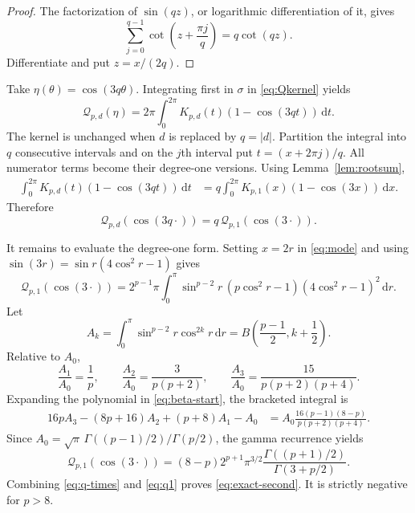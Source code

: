 \documentclass[11pt]{article}
\newcommand{\dd}{\,\mathrm d}
\begin{document}
\begin{proof}
The factorization of $\sin(qz)$, or logarithmic differentiation of it, gives
\[
 \sum_{j=0}^{q-1}\cot\!\left(z+\frac{\pi j}{q}\right)
 =q\cot(qz).
\]
Differentiate and put $z=x/(2q)$.
\end{proof}

Take $\eta(\theta)=\cos(3q\theta)$.  Integrating first in $\sigma$ in
\eqref{eq:Qkernel} yields
\begin{equation}\label{eq:mode}
 \mathcal Q_{p,d}(\eta)
 =2\pi\int_0^{2\pi}K_{p,d}(t)
 (1-\cos(3qt))\dd t.
\end{equation}
The kernel is unchanged when $d$ is replaced by $q=|d|$.  Partition the
integral into $q$ consecutive intervals and on the $j$th interval put
$t=(x+2\pi j)/q$.  All numerator terms become their degree-one versions.
Using Lemma~\ref{lem:rootsum},
\begin{align}
 \int_0^{2\pi}K_{p,d}(t)(1-\cos(3qt))\dd t
 &=q\int_0^{2\pi}K_{p,1}(x)(1-\cos(3x))\dd x.
 \label{eq:fold}
\end{align}
Therefore
\begin{equation}\label{eq:q-times}
 \mathcal Q_{p,d}(\cos(3q\cdot))
 =q\,\mathcal Q_{p,1}(\cos(3\cdot)).
\end{equation}

It remains to evaluate the degree-one form.  Setting $x=2r$ in
\eqref{eq:mode} and using
$\sin(3r)=\sin r(4\cos^2r-1)$ gives
\begin{equation}\label{eq:beta-start}
 \mathcal Q_{p,1}(\cos(3\cdot))
 =2^{p-1}\pi\int_0^\pi
 \sin^{p-2}r\,(p\cos^2r-1)(4\cos^2r-1)^2\dd r.
\end{equation}
Let
\[
 A_k=\int_0^\pi\sin^{p-2}r\cos^{2k}r\dd r
 =B\!\left(\frac{p-1}{2},k+\frac12\right).
\]
Relative to $A_0$,
\[
 \frac{A_1}{A_0}=\frac1p,\qquad
 \frac{A_2}{A_0}=\frac{3}{p(p+2)},\qquad
 \frac{A_3}{A_0}=\frac{15}{p(p+2)(p+4)}.
\]
Expanding the polynomial in \eqref{eq:beta-start}, the bracketed integral is
\begin{align*}
 16pA_3-(8p+16)A_2+(p+8)A_1-A_0
 &=A_0\frac{16(p-1)(8-p)}{p(p+2)(p+4)}.
\end{align*}
Since
$A_0=\sqrt\pi\,\Gamma((p-1)/2)/\Gamma(p/2)$, the gamma recurrence yields
\begin{equation}\label{eq:q1}
 \mathcal Q_{p,1}(\cos(3\cdot))
 =(8-p)2^{p+1}\pi^{3/2}
 \frac{\Gamma((p+1)/2)}{\Gamma(3+p/2)}.
\end{equation}
Combining \eqref{eq:q-times} and \eqref{eq:q1} proves
\eqref{eq:exact-second}.  It is strictly negative for $p>8$.
\end{document}
